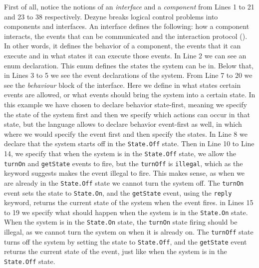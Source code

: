 \documentclass[12pt]{scrreprt}
\begin{document}
First of all, notice the notions of an \textit{interface} and a \textit{component} from Lines 1 to 21 and 23 to 38 respectively. Dezyne breaks logical control problems into components and interfaces. An interface defines the following: how a component interacts, the events that can be communicated and the interaction protocol (\cite{dzndoc}). In other words, it defines the behavior of a component, the events that it can execute and in what states it can execute those events. In Line 2 we can see an enum declaration. This enum defines the states the system can be in. Below that, in Lines 3 to 5 we see the event declarations of the system. %
From Line 7 to 20 we see the \textit{behaviour} block of the interface. Here we define in what states certain events are allowed, or what events should bring the system into a certain state. In this example we have chosen to declare behavior state-first, meaning we specify the state of the system first and then we specify which actions can occur in that state, but the language allows to declare behavior event-first as well, in which where we would specify the event first and then specify the states.
In Line 8 we declare that the system starts off in the \texttt{State.Off} state. Then in Line 10 to Line 14, we specify that when the system is in the \texttt{State.Off} state, we allow the \texttt{turnOn} and \texttt{getState} events to fire, but the \texttt{turnOff} is \texttt{illegal}, which as the keyword suggests makes the event illegal to fire. This makes sense, as when we are already in the \texttt{State.Off} state we cannot turn the system off. The \texttt{turnOn} event sets the state to \texttt{State.On}, and the \texttt{getState} event, using the \texttt{reply} keyword, returns the current state of the system when the event fires. in Lines 15 to 19 we specify what should happen when the system is in the \texttt{State.On} state. When the system is in the \texttt{State.On} state, the \texttt{turnOn} state firing should be illegal, as we cannot turn the system on when it is already on. The \texttt{turnOff} state turns off the system by setting the state to \texttt{State.Off}, and the \texttt{getState} event returns the current state of the event, just like when the system is in the \texttt{State.Off} state.
\\\\
\end{document}
